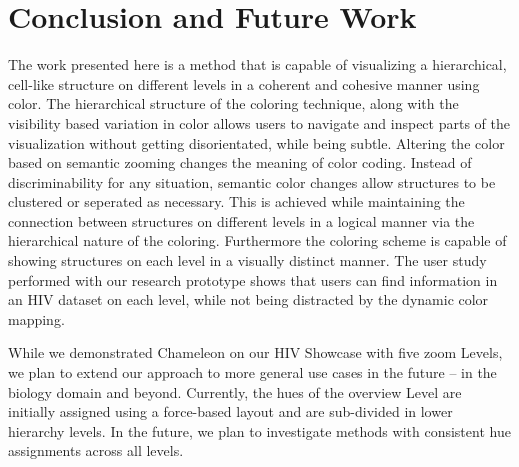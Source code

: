 \documentclass{egpubl}
\begin{document}
	
	
	
	\section{Conclusion and Future Work}
	The work presented here is a method that is capable of visualizing a hierarchical, cell-like structure on different levels in a coherent and cohesive manner using color. 
	The hierarchical structure of the coloring technique, along with the visibility based variation in color allows users to navigate and inspect parts of the visualization without getting disorientated, while being subtle.
	Altering the color based on semantic zooming changes the meaning of color coding.
	Instead of discriminability for any situation, semantic color changes allow structures to be clustered or seperated as necessary.
	This is achieved while maintaining the connection between structures on different levels in a logical manner via the hierarchical nature of the coloring.
	Furthermore the coloring scheme is capable of showing structures on each level in a visually distinct manner. 
	The user study performed with our research prototype shows that users can find information in an HIV dataset on each level, while not being distracted by the dynamic color mapping. 
	
	While we demonstrated Chameleon on our HIV Showcase with five zoom Levels, we plan to extend our approach to more general use cases in the future -- in the biology domain and beyond.
	Currently, the hues of the overview Level are initially assigned using a force-based layout and are sub-divided in lower hierarchy levels. 
	In the future, we plan to investigate methods with consistent hue assignments across all levels.
	
\end{document}
